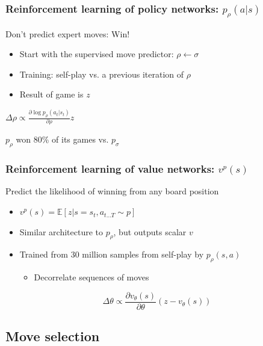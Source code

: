 \documentclass{beamer}
\begin{document}
\begin{frame}
  \frametitle{Reinforcement learning of policy networks: $p_\rho(a|s)$}
  Don't predict expert moves: Win!
  \begin{itemize}
  \item Start with the supervised move predictor: $\rho \leftarrow \sigma$
  \item Training: self-play vs. a previous iteration of $\rho$
  \item Result of game is $z$
  \end{itemize}
  \begin{tcolorbox}
    \begin{center}
      $\Delta \rho \propto \frac{\partial \log p_\rho(a_t|s_t)}{\partial \rho}z$
    \end{center}
  \end{tcolorbox}
  $p_\rho$ won 80\% of its games vs. $p_\sigma$
\end{frame}


\begin{frame}
  \frametitle{Reinforcement learning of value networks: $v^p(s)$}
  Predict the likelihood of winning from any board position
  \begin{itemize}
  \item $v^p(s) = \mathbb{E}\left[ z | s = s_t, a_{t\ldots T} \sim p\right]$
  \item Similar architecture to $p_\rho$, but outputs scalar $v$
  \item Trained from 30 million samples from self-play by $p_\rho(s,a)$
    \begin{itemize}
    \item Decorrelate sequences of moves
    \end{itemize}
  \end{itemize}
  \begin{tcolorbox}
    \begin{equation*}
      \Delta \theta \propto \frac{\partial v_\theta(s)}{\partial \theta}(z-v_\theta(s))
    \end{equation*}
  \end{tcolorbox}
\end{frame}



\subsection{Move selection}
\end{document}
